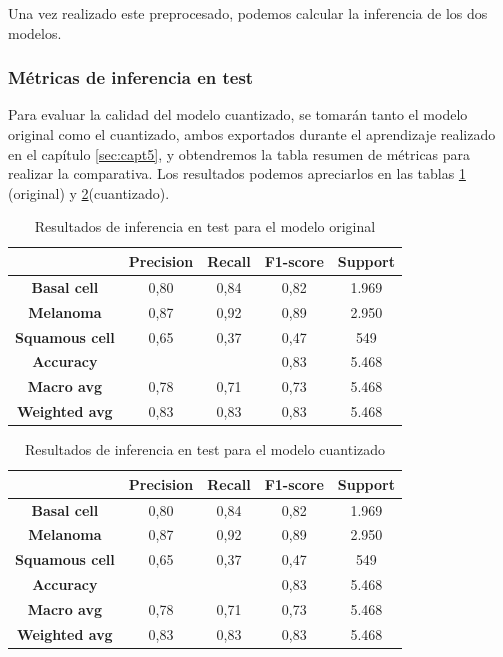 Una vez realizado este preprocesado, podemos calcular la inferencia de los dos modelos.

\subsubsection{Métricas de inferencia en test}
Para evaluar la calidad del modelo cuantizado, se tomarán tanto el modelo original como el cuantizado, ambos exportados durante el aprendizaje realizado en el capítulo \ref{sec:capt5}, y obtendremos la tabla resumen de métricas para realizar la comparativa.
Los resultados  podemos apreciarlos en las tablas \ref{tab:maltestorig} (original) y \ref{tab:maltestquant}(cuantizado).

\begin{table}[!ht]
	\centering
	\begin{tabular}{|c|c|c|c|c|}
		\hline
		~ & \textbf{Precision} & \textbf{Recall} & \textbf{F1-score} & \textbf{Support} \\ \hline
	\textbf{	Basal cell}  & 0,80 & 0,84 & 0,82 & 1.969 \\
		\textbf{Melanoma} & 0,87 & 0,92 & 0,89 & 2.950 \\
		\textbf{Squamous cell}  & 0,65 & 0,37 & 0,47 & 549 \\ \hline
		\textbf{Accuracy} & ~ & ~ & 0,83 & 5.468 \\ \hline
		\textbf{Macro avg} & 0,78 & 0,71 & 0,73 & 5.468 \\
		\textbf{Weighted avg} & 0,83 & 0,83 & 0,83 & 5.468 \\ \hline
	\end{tabular}
	\caption{Resultados de inferencia en test para el modelo original}
	\label{tab:maltestorig}
\end{table}

\begin{table}[!ht]
	\centering
	\begin{tabular}{|c|c|c|c|c|}
		\hline
		~ & \textbf{Precision} & \textbf{Recall} & \textbf{F1-score} & \textbf{Support} \\ \hline
		\textbf{Basal cell} & 0,80 & 0,84 & 0,82 & 1.969 \\
		\textbf{Melanoma} & 0,87 & 0,92 & 0,89 & 2.950 \\
		\textbf{Squamous cell} & 0,65 & 0,37 & 0,47 & 549 \\ \hline
		\textbf{Accuracy} & ~ & ~ & 0,83 & 5.468 \\ \hline
	\textbf{Macro avg} & 0,78 & 0,71 & 0,73 & 5.468 \\
	\textbf{Weighted avg} & 0,83 & 0,83 & 0,83 & 5.468 \\ \hline
	\end{tabular}
	\caption{Resultados de inferencia en test para el modelo cuantizado}
	\label{tab:maltestquant}
\end{table}

